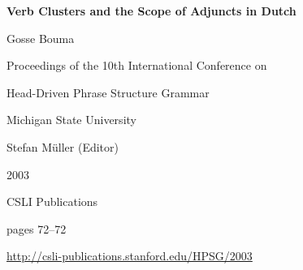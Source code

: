 \documentclass[a4paper,11pt]{article}
\begin{document}
\begin{center}
  {\huge\bf Verb Clusters and the Scope of Adjuncts in Dutch\par}

  \bigskip

  {\LARGE Gosse Bouma\par}

  \vspace*{3\bigskipamount}

  Proceedings of the 10th International Conference on\par Head-Driven Phrase Structure Grammar

  \bigskip

  Michigan State University

  \medskip

  Stefan M{\"u}ller (Editor)

  \medskip

  2003

  \medskip

  CSLI Publications

  \medskip

  pages 72--72

  \medskip

  \url{http://csli-publications.stanford.edu/HPSG/2003}
\end{center}

\newpage

        
\end{document}
